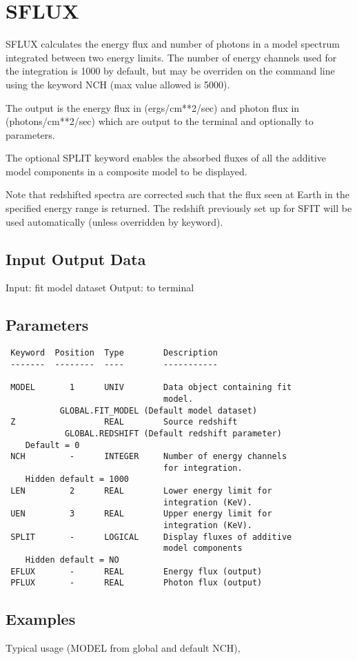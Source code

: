 \documentclass{book}
\renewcommand{\_}{{\tt\char'137}}     %
\begin{document}
\section{SFLUX}
SFLUX calculates the energy flux and number of photons in a model
spectrum integrated between two energy limits. The number of
energy channels used for the integration is 1000 by default, but
may be overriden on the command line using the keyword NCH (max
value allowed is 5000).
 
The output is the energy flux in (ergs/cm**2/sec) and photon flux
in (photons/cm**2/sec)
which are output to the terminal and optionally to parameters.
 
The optional SPLIT keyword enables the absorbed fluxes of all the
additive model components in a composite model to be displayed.
 
Note that redshifted spectra are corrected such that the flux
seen at Earth in the specified energy range is returned. The
redshift previously set up for SFIT will be used automatically
(unless overridden by keyword).
 
\subsection{Input Output Data}
Input: fit model dataset
Output: to terminal
\subsection{Parameters}
\begin{verbatim}
 Keyword  Position  Type        Description
 -------  --------  ----        -----------
 
 MODEL       1      UNIV        Data object containing fit
                                model.
           GLOBAL.FIT_MODEL (Default model dataset)
 Z                  REAL        Source redshift
            GLOBAL.REDSHIFT (Default redshift parameter)
    Default = 0
 NCH         -      INTEGER     Number of energy channels
                                for integration.
    Hidden default = 1000
 LEN         2      REAL        Lower energy limit for
                                integration (KeV).
 UEN         3      REAL        Upper energy limit for
                                integration (KeV).
 SPLIT       -      LOGICAL     Display fluxes of additive
                                model components
    Hidden default = NO
 EFLUX       -      REAL        Energy flux (output)
 PFLUX       -      REAL        Photon flux (output)
\end{verbatim}\subsection{Examples}
Typical usage (MODEL from global and default NCH),
 
\end{document}
